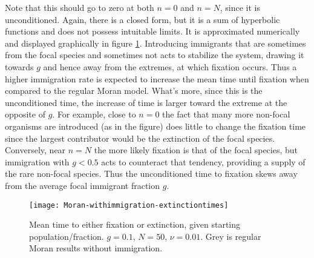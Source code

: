Note that this should go to zero at both $n=0$ and $n=N$, since it is unconditioned. 
Again, there is a closed form, but it is a sum of hyperbolic functions and does not possess intuitable limits. 
It is approximated numerically and displayed graphically in figure \ref{extntimefig}. 
Introducing immigrants that are sometimes from the focal species and sometimes not acts to stabilize the system, drawing it towards $g$ and hence away from the extremes, at which fixation occurs. 
Thus a higher immigration rate is expected to increase the mean time until fixation when compared to the regular Moran model. 
What's more, since this is the unconditioned time, the increase of time is larger toward the extreme at the opposite of $g$. For example, close to $n=0$ the fact that many more non-focal organisms are introduced (as in the figure) does little to change the fixation time since the largest contributor would be the extinction of the focal species. Conversely, near $n=N$ the more likely fixation is that of the focal species, but immigration with $g<0.5$ acts to counteract that tendency, providing a supply of the rare non-focal species. Thus the unconditioned time to fixation skews away from the average focal immigrant fraction $g$. 
\begin{figure}[ht]
	\centering
	\texttt{[image: Moran-withimmigration-extinctiontimes]}
	\caption{Mean time to either fixation or extinction, given starting population/fraction. $g=0.1$, $N=50$, $\nu=0.01$. Grey is regular Moran results without immigration. } \label{extntimefig}
\end{figure}%

